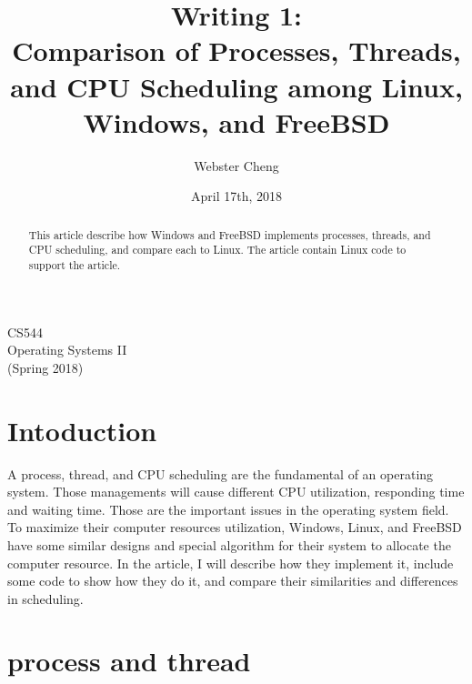 \documentclass[letterpaper,draftclsnofoot,journal,compsoc,10pt,onecolumn]{IEEEtran}
\title{Writing 1: \\
Comparison of Processes, Threads, and CPU Scheduling among Linux, Windows, and FreeBSD}
\author{
  Webster Cheng
}
\date{April 17th, 2018}
\begin{document}
\begin{titlepage} 
\maketitle
\begin{center}
CS544\\
Operating Systems II\\
(Spring 2018)
\vspace{50 mm}
\end{center}

\begin{abstract}
This article describe how Windows and FreeBSD implements processes, threads, and CPU scheduling, and compare each to Linux. The article contain Linux code to support the article.
\end{abstract}
\end{titlepage}

\section{Intoduction}
\indent A process, thread, and CPU scheduling are the fundamental of an operating system. Those managements will cause different CPU utilization, responding time and waiting time. Those are the important issues in the operating system field. To maximize their computer resources utilization, Windows, Linux, and FreeBSD have some similar designs and special algorithm for their system to allocate the computer resource. In the article, I will describe how they implement it, include some code to show how they do it, and compare their similarities and differences in scheduling.

\section{process and thread}
\end{document}
